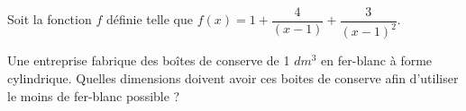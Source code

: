 \documentclass[11pt,addpoints]{exam}
\begin{document}
\begin{questions}
\question[5]

Soit la fonction $f$ définie telle que $f(x) = 1 + \dfrac{4}{(x-1)} + \dfrac{3}{(x-1)^2}$.

\question[3] Une entreprise fabrique des boîtes de conserve de 1 $dm^3$ en fer-blanc à forme cylindrique. Quelles dimensions doivent avoir ces boites de conserve afin d'utiliser le moins de fer-blanc possible ?

\begin{center}
\gradetable[h][questions]
\end{center}

\end{questions}
\end{document}
